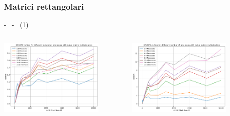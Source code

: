 \documentclass[compress]{beamer}
\begin{document}
\subsubsection*{Matrici rettangolari}
\begin{frame}{\secname \text{ }- \subsecname\ \text{ }- \subsubsecname\ (1)}
    \begin{columns}
            \begin{minipage}{1\textwidth}
                \centering
                \begin{adjustbox}{margin=0cm 0cm 0cm 0cm, center} %
                    \includegraphics[width=0.8\textwidth, frame]{resources/rettangolari_k32_naive.png}
                \end{adjustbox}
                \begin{adjustbox}{margin=0cm 0cm 0cm 0.1cm, center} %
                    \includegraphics[width=0.8\textwidth, frame]{resources/rettangolari_k128_naive.png}
                \end{adjustbox}

\end{minipage}
\end{columns}
\end{frame}
\end{document}
